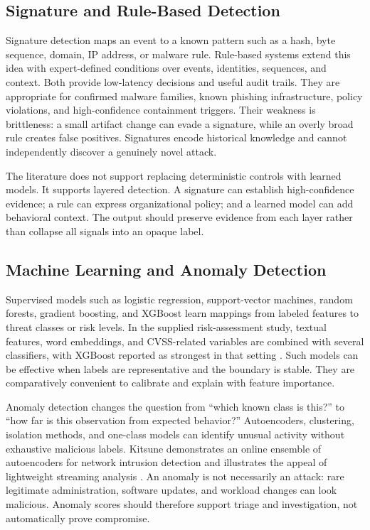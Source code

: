 \documentclass[conference]{IEEEtran}
\begin{document}
\subsection{Signature and Rule-Based Detection}
Signature detection maps an event to a known pattern such as a hash, byte sequence, domain, IP address, or malware rule. Rule-based systems extend this idea with expert-defined conditions over events, identities, sequences, and context. Both provide low-latency decisions and useful audit trails. They are appropriate for confirmed malware families, known phishing infrastructure, policy violations, and high-confidence containment triggers. Their weakness is brittleness: a small artifact change can evade a signature, while an overly broad rule creates false positives. Signatures encode historical knowledge and cannot independently discover a genuinely novel attack.

The literature does not support replacing deterministic controls with learned models. It supports layered detection. A signature can establish high-confidence evidence; a rule can express organizational policy; and a learned model can add behavioral context. The output should preserve evidence from each layer rather than collapse all signals into an opaque label.

\subsection{Machine Learning and Anomaly Detection}
Supervised models such as logistic regression, support-vector machines, random forests, gradient boosting, and XGBoost learn mappings from labeled features to threat classes or risk levels. In the supplied risk-assessment study, textual features, word embeddings, and CVSS-related variables are combined with several classifiers, with XGBoost reported as strongest in that setting \cite{KumarBhatRisk}. Such models can be effective when labels are representative and the boundary is stable. They are comparatively convenient to calibrate and explain with feature importance.

Anomaly detection changes the question from ``which known class is this?'' to ``how far is this observation from expected behavior?'' Autoencoders, clustering, isolation methods, and one-class models can identify unusual activity without exhaustive malicious labels. Kitsune demonstrates an online ensemble of autoencoders for network intrusion detection and illustrates the appeal of lightweight streaming analysis \cite{Mirsky2018}. An anomaly is not necessarily an attack: rare legitimate administration, software updates, and workload changes can look malicious. Anomaly scores should therefore support triage and investigation, not automatically prove compromise.
\end{document}
